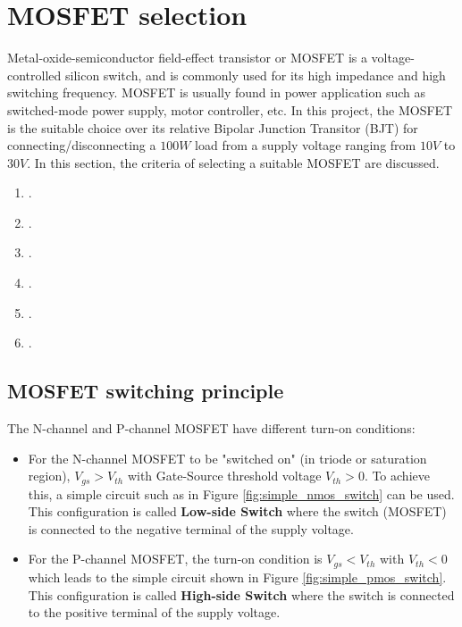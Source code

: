 \documentclass[../main.tex]{subfiles}
\begin{document}
    \section{MOSFET selection}
    \justify
    Metal-oxide-semiconductor field-effect transistor or MOSFET is a voltage-controlled silicon switch, and is commonly used for its high impedance and high switching frequency. MOSFET is usually found in power application such as switched-mode power supply, motor controller, etc. In this project, the MOSFET is the suitable choice over its relative Bipolar Junction Transitor (BJT) for connecting/disconnecting a $100W$ load from a supply voltage ranging from $10V$ to $30V$. In this section, the criteria of selecting a suitable MOSFET are discussed.
    \begin{enumerate}
        \item {}.
        \item {}.
        \item {}.
        \item {}.
        \item {}.
        \item {}.
    \end{enumerate}

    \pagebreak
    \subsection{MOSFET switching principle} \label{ssec:switch_type}    
    
    \justify
    The N-channel and P-channel MOSFET have different turn-on conditions:
    \begin{itemize}
        \item For the N-channel MOSFET to be  "switched on" (in triode or saturation region), $V_{gs} > V_{th}$ with Gate-Source threshold voltage $V_{th} > 0$. To achieve this, a simple circuit such as in Figure \ref{fig:simple_nmos_switch} can be used. This configuration is called \textbf{Low-side Switch} where  the switch (MOSFET) is connected to the negative terminal of the supply voltage.
        \item For the P-channel MOSFET, the turn-on condition is $V_{gs} < V_{th}$ with $V_{th} < 0$ which leads to the simple circuit shown in Figure \ref{fig:simple_pmos_switch}. This configuration is called \textbf{High-side Switch} where the switch is connected to the positive terminal of the supply voltage.
    \end{itemize}
     
\end{document}
